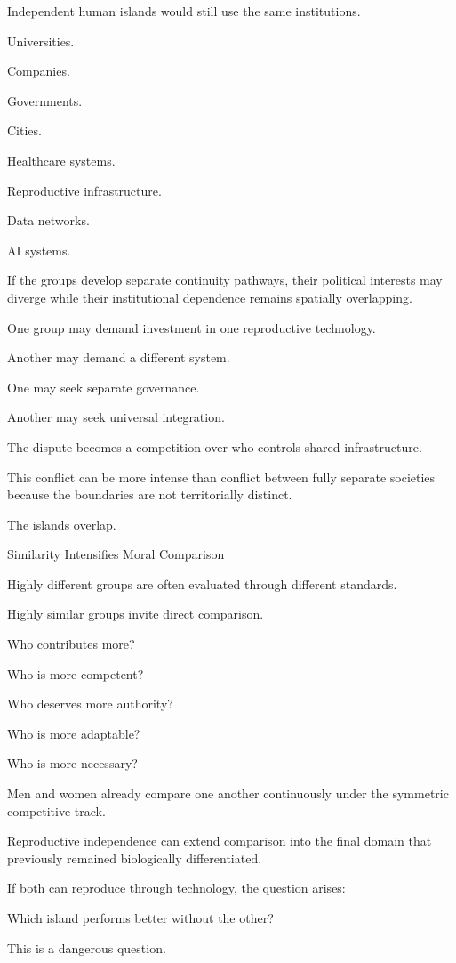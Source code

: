 Independent human islands would still use the same institutions.

Universities.

Companies.

Governments.

Cities.

Healthcare systems.

Reproductive infrastructure.

Data networks.

AI systems.

If the groups develop separate continuity pathways, their political interests may diverge while their institutional dependence remains spatially overlapping.

One group may demand investment in one reproductive technology.

Another may demand a different system.

One may seek separate governance.

Another may seek universal integration.

The dispute becomes a competition over who controls shared infrastructure.

This conflict can be more intense than conflict between fully separate societies because the boundaries are not territorially distinct.

The islands overlap.

Similarity Intensifies Moral Comparison

Highly different groups are often evaluated through different standards.

Highly similar groups invite direct comparison.

Who contributes more?

Who is more competent?

Who deserves more authority?

Who is more adaptable?

Who is more necessary?

Men and women already compare one another continuously under the symmetric competitive track.

Reproductive independence can extend comparison into the final domain that previously remained biologically differentiated.

If both can reproduce through technology, the question arises:

Which island performs better without the other?

This is a dangerous question.

